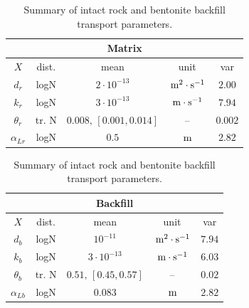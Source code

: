 \begin{table}[ht]
    \caption{Summary of intact rock and bentonite backfill transport
    parameters.}
    \label{tab:param_matrix_backfill}
    \centering
    \begin{minipage}{0.44\textwidth}
        \centering
        \footnotesize
        \setlength{\tabcolsep}{4pt}
        \renewcommand{\arraystretch}{1.25}
        \begin{tabular}{@{}ccccc@{}}
        \toprule
        \multicolumn{5}{c}{Matrix} \\
        \toprule
        $X$ & dist. & mean & unit & var \\
        \midrule
        $d_r$ & logN & $2 \cdot 10^{-13}$ &
        $\,\mathrm{m^2\cdot s^{-1}}$ & $2.00$ \\
        \(k_r\) & logN & $3 \cdot 10^{-13}$ & $\,\mathrm{m\cdot s^{-1}}$& $7.94$ \\
        \(\theta_r\) & tr. N & $0.008,\,[0.001,0.014]$ & -- & $0.002$ \\
        \(\alpha_{Lr}\) & logN & $0.5$ & $\,\mathrm{m}$ & $2.82$ \\
        \bottomrule
        \end{tabular}
    \end{minipage}
    \hfill
    \begin{minipage}{0.44\textwidth}
        \centering
        \footnotesize
        \setlength{\tabcolsep}{4pt}
        \renewcommand{\arraystretch}{1.25}
        \begin{tabular}{@{}ccccc@{}}
        \toprule
        \multicolumn{5}{c}{Backfill} \\
        \toprule
        $X$ & dist. & mean & unit & var \\
        \midrule
        $d_b$ & logN & $10^{-11}$ &
        $\,\mathrm{m^2\cdot s^{-1}}$ & $7.94$ \\
        \(k_b\) & logN & $3\cdot10^{-13}$ & $\,\mathrm{m\cdot s^{-1}}$& $6.03$ \\
        \(\theta_b\) & tr. N & $0.51,\,[0.45,0.57]$ & -- & $0.02$ \\
        \(\alpha_{Lb}\) & logN & $0.083$ & $\,\mathrm{m}$ & $2.82$ \\
        \bottomrule
        \end{tabular}
    \end{minipage}

\end{table}

\FloatBarrier

